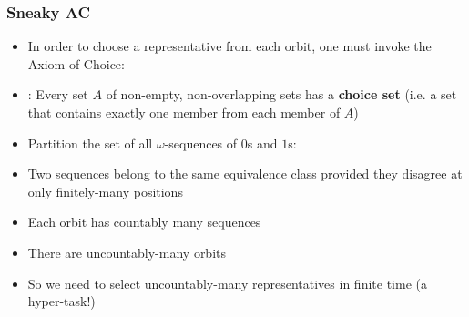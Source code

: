 \begin{frame}
\frametitle{Sneaky AC}

\begin{itemize}[<+->]

\item In order to choose a representative from each orbit, one must invoke the Axiom of Choice:

\item[] : Every set $A$ of non-empty, non-overlapping sets has a \textbf{choice set} (i.e. a set that contains exactly one member from each member of $A$)

\item Partition the set of all $\omega$-sequences of $0$s and $1$s: 
\bi
\item Two sequences belong to the same equivalence class provided they disagree at only finitely-many positions
\item Each orbit has countably many sequences
\item There are uncountably-many orbits %
\item So we need to select uncountably-many representatives in finite time (a hyper-task!)
\ei

\end{itemize}
\end{frame}

